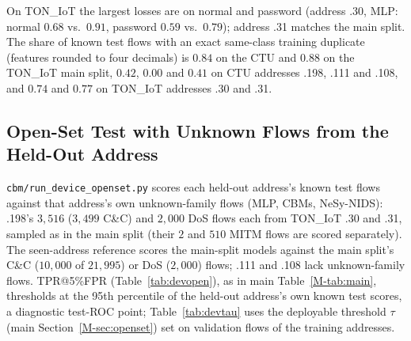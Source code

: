 \documentclass[journal]{IEEEtran}
\begin{document}
On TON\_IoT the largest losses are on normal and password (address .30, MLP: normal $0.68$ vs.\
$0.91$, password $0.59$ vs.\ $0.79$); address .31 matches the main split. The share of known test
flows with an exact same-class training duplicate (features rounded to four decimals) is $0.84$ on
the CTU and $0.88$ on the TON\_IoT main split, $0.42$, $0.00$ and $0.41$ on CTU addresses .198, .111
and .108, and $0.74$ and $0.77$ on TON\_IoT addresses .30 and .31.

\subsection{Open-Set Test with Unknown Flows from the Held-Out Address}
\texttt{cbm/run\_device\_openset.py} scores each held-out address's known test flows against that
address's own unknown-family flows (MLP, CBMs, NeSy-NIDS): .198's $3{,}516$ ($3{,}499$ C\&C) and
$2{,}000$ DoS flows each from TON\_IoT .30 and .31, sampled as in the main split (their $2$ and $510$
MITM flows are scored separately). The seen-address reference scores the main-split models against
the main split's C\&C ($10{,}000$ of $21{,}995$) or DoS ($2{,}000$) flows; .111 and .108 lack
unknown-family flows. TPR@5\%FPR (Table~\ref{tab:devopen}), as in main Table~\ref{M-tab:main},
thresholds at the 95th percentile of the held-out address's own known test scores, a diagnostic
test-ROC point; Table~\ref{tab:devtau} uses the deployable threshold $\tau$ (main
Section~\ref{M-sec:openset}) set on validation flows of the training addresses.
\end{document}
